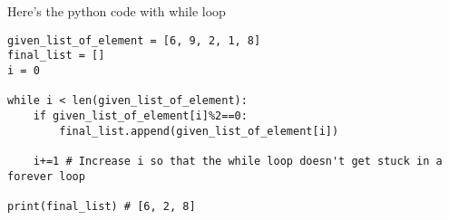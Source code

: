 \noindent Here's the python code with while loop

\noindent\begin{minipage}{\linewidth}
\begin{lstlisting}[style=python]
given_list_of_element = [6, 9, 2, 1, 8]
final_list = []
i = 0

while i < len(given_list_of_element):
    if given_list_of_element[i]%2==0:
        final_list.append(given_list_of_element[i])
        
    i+=1 # Increase i so that the while loop doesn't get stuck in a forever loop
        
print(final_list) # [6, 2, 8]
\end{lstlisting}

\end{minipage}